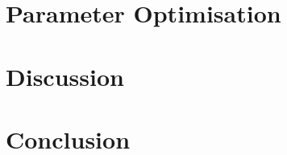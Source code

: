 \documentclass[aps,prstab,reprint,amsmath,amssymb,groupedaddress]{revtex4-1}
\begin{document}




\section[\label{S:PO}]{Parameter Optimisation}



\section[\label{S:D}]{Discussion}
\section[\label{S:C}]{Conclusion}




\end{document}
